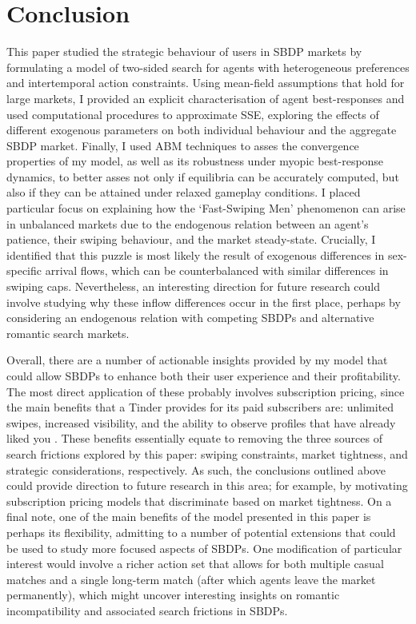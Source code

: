 \section{Conclusion}
\label{sec:section5}
This paper studied the strategic behaviour of users in SBDP markets by formulating a model of two-sided search for agents with heterogeneous preferences and intertemporal action constraints. 
Using mean-field assumptions that hold for large markets, I provided an explicit characterisation of agent best-responses and used computational procedures to approximate SSE, exploring the effects of different exogenous parameters on both individual behaviour and the aggregate SBDP market.
Finally, I used ABM techniques to asses the convergence properties of my model, as well as its robustness under myopic best-response dynamics, to better asses not only if equilibria can be accurately computed, but also if they can be attained under relaxed gameplay conditions.
I placed particular focus on explaining how the `Fast-Swiping Men' phenomenon can arise in unbalanced markets due to the endogenous relation between an agent's patience, their swiping behaviour, and the market steady-state. 
Crucially, I identified that this puzzle is most likely the result of exogenous differences in sex-specific arrival flows, which can be counterbalanced with similar differences in swiping caps. Nevertheless, an interesting direction for future research could involve studying why these inflow differences occur in the first place, perhaps by considering an endogenous relation with competing SBDPs and alternative romantic search markets. 

Overall, there are a number of actionable insights provided by my model that could allow SBDPs to enhance both their user experience and their profitability.
The most direct application of these probably involves subscription pricing, since the main benefits that a Tinder provides for its paid subscribers are: unlimited swipes, increased visibility, and the ability to observe profiles that have already liked you \cite{web:tinder_subscription}.
These benefits essentially equate to removing the three sources of search frictions explored by this paper: swiping constraints, market tightness, and strategic considerations, respectively.
As such, the conclusions outlined above could provide direction to future research in this area; for example, by motivating subscription pricing models that discriminate based on market tightness.
On a final note, one of the main benefits of the model presented in this paper is perhaps its flexibility, admitting to a number of potential extensions that could be used to study more focused aspects of SBDPs. 
One modification of particular interest would involve a richer action set that allows for both multiple casual matches and a single long-term match (after which agents leave the market permanently), which might uncover interesting insights on romantic incompatibility and associated search frictions in SBDPs.